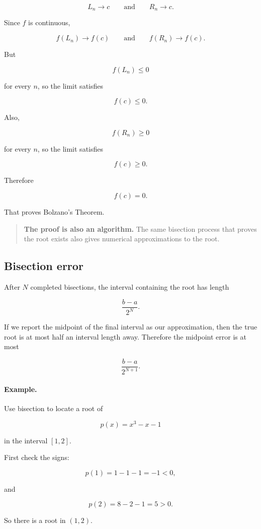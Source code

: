 \[
L_n\to c
\qquad\text{and}\qquad
R_n\to c.
\]

Since \(f\) is continuous,

\[
f(L_n)\to f(c)
\qquad\text{and}\qquad
f(R_n)\to f(c).
\]

But

\[
f(L_n)\le0
\]

for every \(n\), so the limit satisfies

\[
f(c)\le0.
\]

Also,

\[
f(R_n)\ge0
\]

for every \(n\), so the limit satisfies

\[
f(c)\ge0.
\]

Therefore

\[
f(c)=0.
\]

That proves Bolzano's Theorem.

\begin{quote}
\textbf{The proof is also an algorithm.}
The same bisection process that proves the root exists also gives numerical
approximations to the root.
\end{quote}

\subsection{Bisection error}
\label{appsubsec:bisection-error}

After \(N\) completed bisections, the interval containing the root has length

\[
\boxed{
\frac{b-a}{2^N}.
}
\]

If we report the midpoint of the final interval as our approximation, then the true root
is at most half an interval length away.  Therefore the midpoint error is at most

\[
\boxed{
\frac{b-a}{2^{N+1}}.
}
\]

\paragraph{Example.}
Use bisection to locate a root of

\[
p(x)=x^3-x-1
\]

in the interval \([1,2]\).

First check the signs:

\[
p(1)=1-1-1=-1<0,
\]

and

\[
p(2)=8-2-1=5>0.
\]

So there is a root in \((1,2)\).


